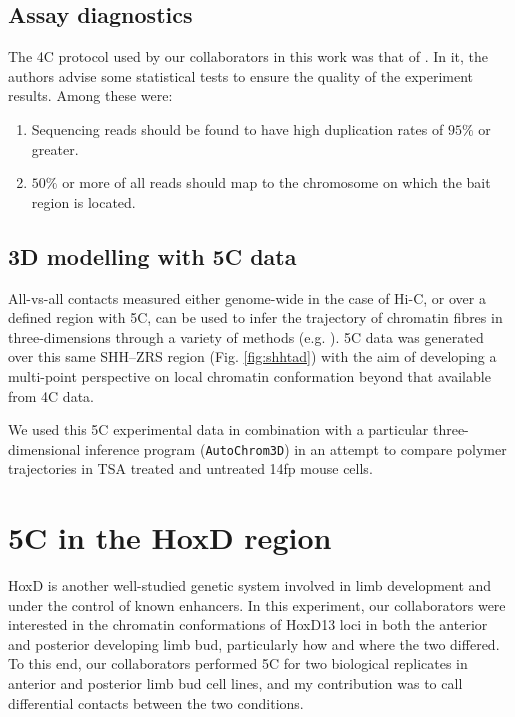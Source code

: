 \documentclass[a4paper,10pt,oneside]{book}
\begin{document}
\subsection{Assay diagnostics}

The 4C protocol used by our collaborators in this work was that of \citet{Stadhouders2013}. In it, the authors advise some statistical tests to ensure the quality of the experiment results. Among these were:\cite{Stadhouders2013}

\begin{enumerate}
\item Sequencing reads should be found to have high duplication rates of $95\%$ or greater.
\item $50\%$ or more of all reads should map to the chromosome on which the bait region is located.
\end{enumerate}

\subsection{3D modelling with 5C data}

All-vs-all contacts measured either genome-wide in the case of Hi-C, or over a defined region with 5C, can be used to infer the trajectory of chromatin fibres in three-dimensions through a variety of methods (e.g. \cite{Hu2013a, Varoquaux2014a, Lesne2014, Trieu2014, Peng2013}). 5C data was generated over this same SHH--ZRS region (Fig. \ref{fig:shhtad}) with the aim of developing a multi-point perspective on local chromatin conformation beyond that available from 4C data.

We used this 5C experimental data in combination with a particular three-dimensional inference program  (\texttt{AutoChrom3D}\cite{Peng2013}) in an attempt to compare polymer trajectories in TSA treated and untreated 14fp mouse cells.

\section{5C in the HoxD region}

HoxD is another well-studied genetic system involved in limb development and under the control of known enhancers. In this experiment, our collaborators were interested in the chromatin conformations of HoxD13 loci in both the anterior and posterior developing limb bud, particularly how and where the two differed. To this end, our collaborators performed 5C for two biological replicates in anterior and posterior limb bud cell lines, and my contribution was to call differential contacts between the two conditions.
\end{document}
